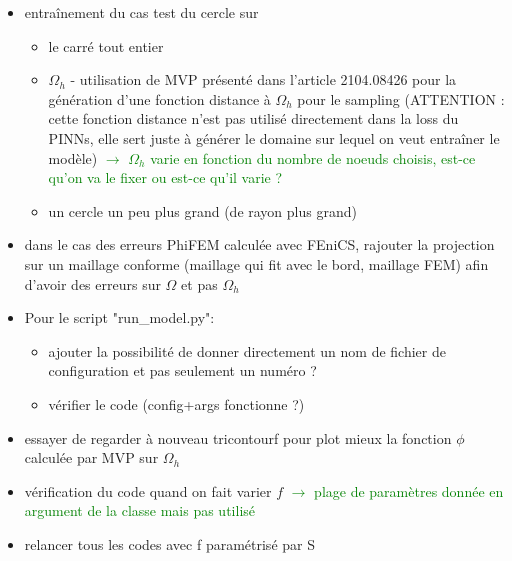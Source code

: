 \documentclass{article}
\newcommand{\done}{\rlap{$\square$}{\raisebox{2pt}{\large\hspace{1pt}\ding{51}}}%
	\hspace{-2.5pt}}
\newcommand{\swontfix}{\rlap{\LARGE $\circ$}{\hspace{1pt}\ding{55}}}
\begin{document}
\begin{itemize}[label=$\square$]
		\item entraînement du cas test du cercle sur 
		\begin{itemize}[label=\LARGE $\circ$]
			\item le carré tout entier
			\item[\swontfix] $\Omega_h$ - utilisation de MVP présenté dans l'article 2104.08426 pour la génération d'une fonction distance à $\Omega_h$ pour le sampling (ATTENTION : cette fonction distance n'est pas utilisé directement dans la loss du PINNs, elle sert juste à générer le domaine sur lequel on veut entraîner le modèle) \textcolor{Green}{$\rightarrow$ $\Omega_h$ varie en fonction du nombre de noeuds choisis, est-ce qu'on va le fixer ou est-ce qu'il varie ?}
			\item un cercle un peu plus grand (de rayon plus grand) 
		\end{itemize}
		\item dans le cas des erreurs PhiFEM calculée avec FEniCS, rajouter la projection sur un maillage conforme (maillage qui fit avec le bord, maillage FEM) afin d'avoir des erreurs sur $\Omega$ et pas $\Omega_h$
		\item Pour le script "run\_model.py":
		\begin{itemize}[label=\LARGE $\circ$]
			\item ajouter la possibilité de donner directement un nom de fichier de configuration et pas seulement un numéro ?
			\item vérifier le code (config+args fonctionne ?)
		\end{itemize}
		\item essayer de regarder à nouveau tricontourf pour plot mieux la fonction $\phi$ calculée par MVP sur $\Omega_h$
		\item[\done] vérification du code quand on fait varier $f$ \textcolor{Green}{$\rightarrow$ plage de paramètres donnée en argument de la classe mais pas utilisé}
		\item relancer tous les codes avec f paramétrisé par S
	\end{itemize}
\end{document}
